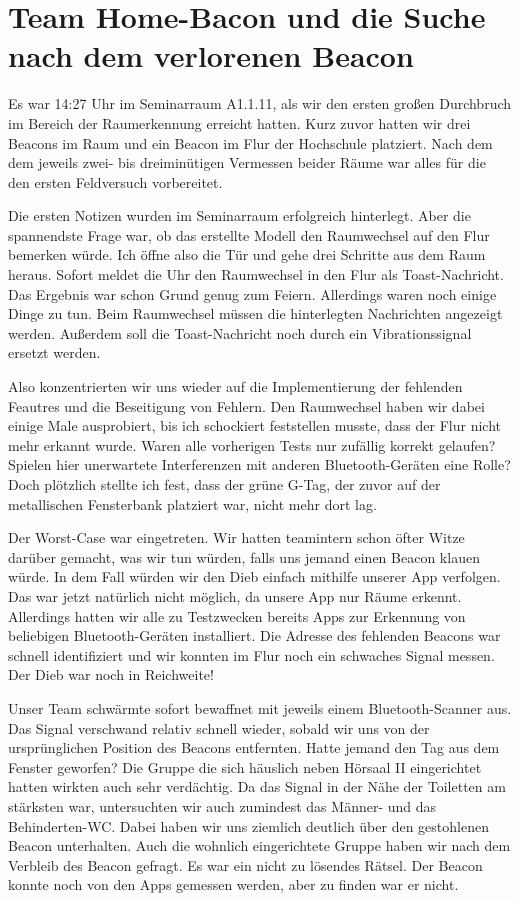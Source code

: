 \section{Team Home-Bacon und die Suche nach dem verlorenen Beacon}

Es war 14:27 Uhr im Seminarraum A1.1.11, als wir den ersten großen Durchbruch
im Bereich der Raumerkennung erreicht hatten. Kurz zuvor hatten wir drei Beacons
im Raum und ein Beacon im Flur der Hochschule platziert. Nach dem dem jeweils
zwei- bis dreiminütigen Vermessen beider Räume war alles für die den ersten
Feldversuch vorbereitet.

Die ersten Notizen wurden im Seminarraum erfolgreich hinterlegt. Aber die
spannendste Frage war, ob das erstellte Modell den Raumwechsel auf den
Flur bemerken würde. Ich öffne also die Tür und gehe drei Schritte aus dem Raum
heraus. Sofort meldet die Uhr den Raumwechsel in den Flur als Toast-Nachricht.
Das Ergebnis war schon Grund genug zum Feiern. Allerdings waren noch einige Dinge
zu tun. Beim Raumwechsel müssen die hinterlegten Nachrichten angezeigt werden.
Außerdem soll die Toast-Nachricht noch durch ein Vibrationssignal ersetzt werden.

Also konzentrierten wir uns wieder auf die Implementierung der fehlenden
Feautres und die Beseitigung von Fehlern. Den Raumwechsel haben wir dabei einige
Male ausprobiert, bis ich schockiert feststellen musste, dass der Flur nicht
mehr erkannt wurde. Waren alle vorherigen Tests nur zufällig korrekt gelaufen?
Spielen hier unerwartete Interferenzen mit anderen Bluetooth-Geräten eine Rolle?
Doch plötzlich stellte ich fest, dass der grüne G-Tag, der zuvor auf der metallischen
Fensterbank platziert war, nicht mehr dort lag.

Der Worst-Case war eingetreten. Wir hatten teamintern schon öfter Witze darüber
gemacht, was wir tun würden, falls uns jemand einen Beacon klauen würde.
In dem Fall würden wir den Dieb einfach mithilfe unserer App verfolgen.
Das war jetzt natürlich nicht möglich, da unsere App nur Räume erkennt.
Allerdings hatten wir alle zu Testzwecken bereits Apps zur Erkennung von
beliebigen Bluetooth-Geräten installiert. Die Adresse des fehlenden Beacons
war schnell identifiziert und wir konnten im Flur noch ein schwaches Signal
messen. Der Dieb war noch in Reichweite!

Unser Team schwärmte sofort bewaffnet mit jeweils einem Bluetooth-Scanner aus.
Das Signal verschwand relativ schnell wieder, sobald wir uns von der ursprünglichen
Position des Beacons entfernten. Hatte jemand den Tag aus dem Fenster geworfen?
Die Gruppe die sich häuslich neben Hörsaal II eingerichtet hatten wirkten auch
sehr verdächtig. Da das Signal in der Nähe der Toiletten am stärksten war,
untersuchten wir auch zumindest das Männer- und das Behinderten-WC. Dabei haben wir
uns ziemlich deutlich über den gestohlenen Beacon unterhalten. Auch die
wohnlich eingerichtete Gruppe haben wir nach dem Verbleib des Beacon gefragt.
Es war ein nicht zu lösendes Rätsel. Der Beacon konnte noch von den Apps gemessen
werden, aber zu finden war er nicht.

